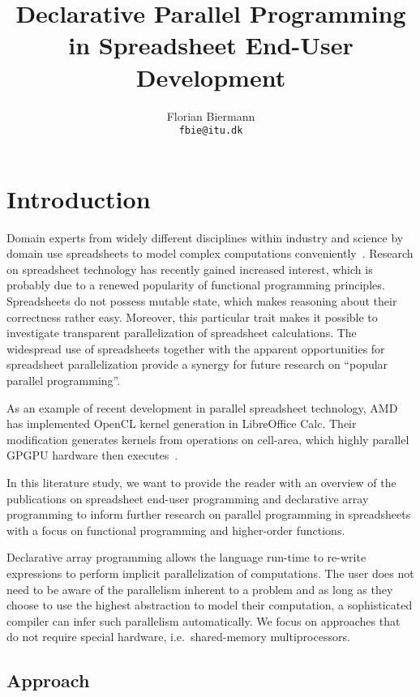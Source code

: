 \documentclass[a4paper]{article}
\title{Declarative Parallel Programming in Spreadsheet End-User
  Development}
\author{Florian Biermann\\\small{\texttt{fbie@itu.dk}}}
\begin{document}
\maketitle

\section{Introduction}
\label{sec:intro}

Domain experts from widely different disciplines within industry and
science by domain use spreadsheets to model complex computations
conveniently~\cite{Sestoft2014Spreadsheet}. Research on spreadsheet
technology has recently gained increased interest, which is probably
due to a renewed popularity of functional programming
principles. Spreadsheets do not possess mutable state, which makes
reasoning about their correctness rather easy. Moreover, this
particular trait makes it possible to investigate transparent
parallelization of spreadsheet calculations. The widespread use of
spreadsheets together with the apparent opportunities for spreadsheet
parallelization provide a synergy for future research on ``popular
parallel programming''.

As an example of recent development in parallel spreadsheet
technology, AMD has implemented OpenCL kernel generation in
LibreOffice Calc. Their modification generates kernels from operations
on cell-area, which highly parallel GPGPU hardware then
executes~\cite{Trudeau2015Collaboration}.

In this literature study, we want to provide the reader with an
overview of the publications on spreadsheet end-user programming and
declarative array programming to inform further research on parallel
programming in spreadsheets with a focus on functional programming and
higher-order functions.

Declarative array programming allows the language run-time to re-write
expressions to perform implicit parallelization of computations. The
user does not need to be aware of the parallelism inherent to a
problem and as long as they choose to use the highest abstraction to
model their computation, a sophisticated compiler can infer such
parallelism automatically. We focus on approaches that do not require
special hardware, i.e.\ shared-memory multiprocessors.

\subsection{Approach}
\label{sec:approach}
\end{document}
